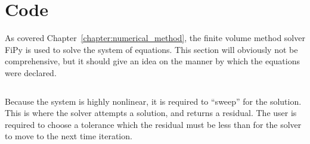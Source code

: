 \chapter{Code}\label{chapter:Code}
As covered Chapter~\ref{chapter:numerical_method}, the finite volume method solver FiPy \cite{guyer_fipy:_2009} is used to solve the system of equations.
This section will obviously not be comprehensive, but it should give an idea on the manner by which the equations were declared.
\inputminted[firstline=22, lastline=43, tabsize=4, breaklines=true, fontsize=\footnotesize, frame=single, linenos=true]{python}{../FiPy_Model/solving_flux.py}

Because the system is highly nonlinear, it is required to ``sweep'' for the solution.
This is where the solver attempts a solution, and returns a residual.
The user is required to choose a tolerance which the residual must be less than for the solver to move to the next time iteration.
\inputminted[firstline=98, lastline=113, tabsize=4, breaklines=true, fontsize=\footnotesize, frame=single, linenos=true]{python}{../FiPy_Model/solving_flux.py}


